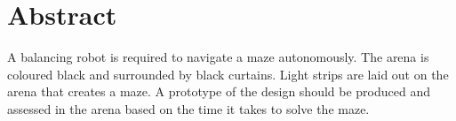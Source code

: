 \section{Abstract}

A balancing robot is required to navigate a maze autonomously. The arena is coloured black and surrounded by black curtains. Light strips are laid out on the arena that creates a maze.
A prototype of the design should be produced and assessed in the arena based on the time it takes to solve the maze.

